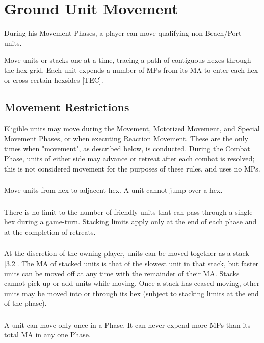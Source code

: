 \section{Ground Unit Movement}
During his Movement Phases, a player can move qualifying non-Beach/Port units.

Move units or stacks one at a time, tracing a path of contiguous hexes through the hex grid. Each unit expends a number of MPs from its MA to enter each hex or cross certain hexsides [TEC].

\subsection{Movement Restrictions}

Eligible units may move during the Movement, Motorized Movement, and Special Movement Phases, or when executing Reaction Movement. These are the only times when "movement", as described below, is conducted. During the Combat Phase, units of either side may advance or retreat after each combat is resolved; this is not considered movement for the purposes of these rules, and uses no MPs.

\subsubsection{}
Move units from hex to adjacent hex. A unit cannot jump over a hex.

\subsubsection{}
There is no limit to the number of friendly units that can pass through a single hex during a game-turn. Stacking limits apply only at the end of each phase and at the completion of retreats.

\subsubsection{}
At the discretion of the owning player, units can be moved together as a stack [3.2]. The MA of stacked units is that of the slowest unit in that stack, but faster units can be moved off at any time with the remainder of their MA. Stacks cannot pick up or add units while moving. Once a stack has ceased moving, other units may be moved into or through its hex (subject to stacking limits at the end of the phase).

\subsubsection{}
A unit can move only once in a Phase. It can never expend more MPs than its total MA in any one Phase.

